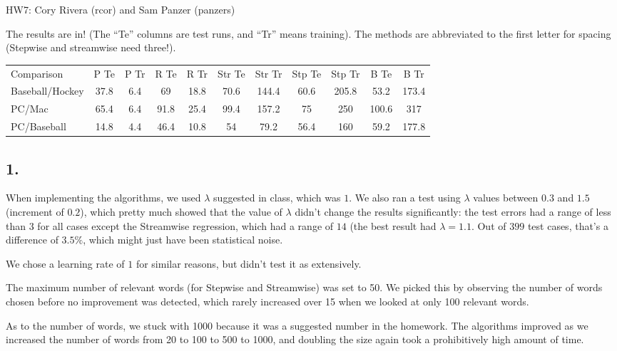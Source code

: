 \documentclass{article}
\begin{document}
\begin{center}
  HW7: Cory Rivera (rcor) and Sam Panzer (panzers)
\end{center}

The results are in! (The ``Te'' columns are test runs, and ``Tr'' means training). The methods are abbreviated to the first letter for spacing (Stepwise and streamwise need three!).
\vspace{1mm}

\begin{tabular}{lcccccccccc}
Comparison & P Te & P Tr & R Te & R Tr & Str Te & Str Tr & Stp Te & Stp Tr & B Te & B Tr\\
Baseball/Hockey & 37.8 & 6.4 & 69 & 18.8 & 70.6 & 144.4 & 60.6 & 205.8 & 53.2 & 173.4\\
PC/Mac & 65.4 & 6.4 & 91.8 & 25.4 & 99.4 & 157.2 & 75 & 250 & 100.6 & 317\\
PC/Baseball & 14.8 & 4.4 & 46.4 & 10.8 & 54 & 79.2 & 56.4 & 160 & 59.2 & 177.8\\
\end{tabular}


\subsection{1.}
  When implementing the algorithms, we used $\lambda$ suggested in class, which was $1$.
  We also ran a test using $\lambda$ values between $0.3$ and $1.5$ (increment of $0.2$), which pretty much showed that the value of $\lambda$ didn't change the results significantly:
  the test errors had a range of less than $3$ for all cases except the Streamwise regression, which had a range of $14$ (the best result had $\lambda=1.1$.
  Out of $399$ test cases, that's a difference of $3.5\%$, which might just have been statistical noise.

  We chose a learning rate of $1$ for similar reasons, but didn't test it as extensively.

  The maximum number of relevant words (for Stepwise and Streamwise) was set to 50.
  We picked this by observing the number of words chosen before no improvement was detected, which rarely increased over 15 when we looked at only 100 relevant words.

  As to the number of words, we stuck with 1000 because it was a suggested number in the homework. The algorithms improved as we increased the number of words from 20 to 100 to 500 to 1000, and doubling the size again took a prohibitively high amount of time.
\end{document}
